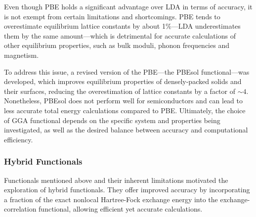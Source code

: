 Even though PBE holds a significant advantage over LDA in terms of accuracy, it is not exempt from certain limitations and shortcomings.  PBE tends to overestimate equilibrium lattice constants by about 1\%---LDA underestimates them by the same amount---which is detrimental for accurate calculations of other equilibrium properties, such as bulk moduli, phonon frequencies and magnetism.

To address this issue, a revised version of the PBE---the PBEsol functional\supercite{Perdew2008}---was developed, which improves equilibrium properties of densely-packed solids and their surfaces, reducing the overestimation of lattice constants by a factor of $\sim 4$. Nonetheless, PBEsol does not perform well for semiconductors and can lead to less accurate total energy calculations compared to PBE.  Ultimately, the choice of GGA functional depends on the specific system and properties being investigated, as well as the desired balance between accuracy and computational efficiency.

\subsubsection{Hybrid Functionals}
Functionals mentioned above and their inherent limitations motivated the exploration of hybrid functionals. They offer improved accuracy by incorporating a fraction of the exact nonlocal Hartree-Fock exchange energy into the exchange-correlation functional, allowing efficient yet accurate calculations. 

